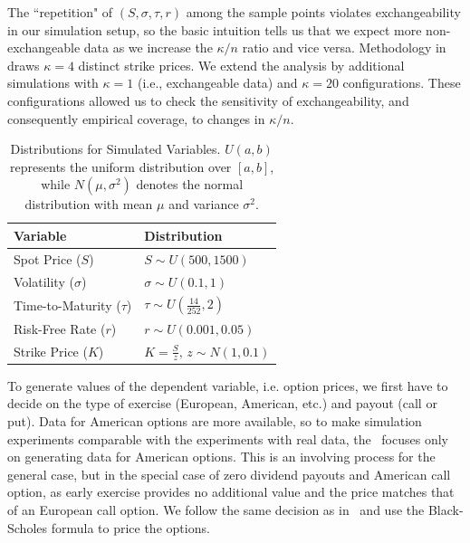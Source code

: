 \documentclass{article}
\theoremstyle{definition}
\begin{document}

The ``repetition" of $(S, \sigma, \tau, r)$ among the sample points violates exchangeability in our simulation setup, so the basic intuition tells us that we expect more non-exchangeable data as we increase the $\kappa / n$ ratio and vice versa. Methodology in~\cite{bastos} draws $\kappa=4$ distinct strike prices. We extend the analysis by additional simulations with $\kappa=1$ (i.e., exchangeable data) and $\kappa=20$ configurations. These configurations allowed us to check the sensitivity of exchangeability, and consequently empirical coverage, to changes in $\kappa / n$.

\begin{table}[]
\centering
\caption{Distributions for Simulated Variables. $U(a, b)$ represents the uniform distribution over $[a, b]$, while $N(\mu, \sigma^2)$ denotes the normal distribution with mean $\mu$ and variance $\sigma^2$.}
\label{tab:distributions}
\begin{tabular}{@{}ll@{}}
\toprule
\textbf{Variable} & \textbf{Distribution} \\
\midrule
Spot Price ($S$) & $S \sim U(500, 1500)$ \\
Volatility ($\sigma$) & $\sigma \sim U(0.1, 1)$ \\
Time-to-Maturity ($\tau$) & $\tau \sim U\left(\frac{14}{252}, 2\right)$ \\
Risk-Free Rate ($r$) & $r \sim U(0.001, 0.05)$ \\
Strike Price ($K$) & $K = \frac{S}{z}, \, z \sim N(1, 0.1)$ \\
\bottomrule
\end{tabular}
\end{table} 

To generate values of the dependent variable, i.e. option prices, we first have to decide on the type of exercise (European, American, etc.) and payout (call or put). Data for American options are more available, so to make simulation experiments comparable with the experiments with real data, the~\cite{bastos} focuses only on generating data for American options. This is an involving process for the general case, but in the special case of zero dividend payouts and American call option, as early exercise provides no additional value and the price matches that of an European call option. We follow the same decision as in~\cite{bastos} and use the Black-Scholes formula to price the options. 
\end{document}
